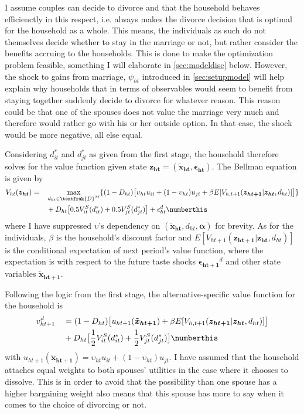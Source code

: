 I assume couples can decide to divorce and that the household behaves efficienctly in this respect, i.e. always makes the divorce decision that is optimal for the household as a whole. This means, the individuals as such do not themselves decide whether to stay in the marriage or not, but rather consider the benefits accruing to the households. This is done to make the optimization problem feasible, something I will elaborate in \autoref{sec:modeldisc} below. However, the shock to gains from marriage, $\psi_{ht}$ introduced in \autoref{sec:setupmodel} will help explain why households that in terms of observables would seem to benefit from staying together suddenly decide to divorce for whatever reason. This reason could be that one of the spouses does not value the marriage very much and therefore would rather go with his or her outside option. In that case, the shock would be more negative, all else equal.

Considering $d_{it}^*$ and $d_{jt}^*$ as given from the first stage, the household therefore solves for the value function given state $\boldsymbol{z_{ht}}=(\boldsymbol{\tilde{x}_{ht}},\boldsymbol{\epsilon_{ht}})$. The Bellman equation is given by
\begin{alignat*}{3}
&V_{ht}(\boldsymbol{z_{ht}})=&&\max_{d_{ht}\in \textfrak{D}^M} \{ (1-D_{ht})\big[\upsilon_{ht} u_{it}+(1-\upsilon_{ht})u_{jt} +\beta E[V_{h,t+1}(\boldsymbol{z_{ht+1}}|\boldsymbol{z_{ht}},d_{ht})] \big] \} \\
& &&+D_{ht}\big[0.5V_{it}^S(d_{it}^*)+0.5V_{jt}^S(d_{jt}^*)\big]+\epsilon_{ht}^d \numberthis
\label{eq:Vh}
\end{alignat*}
where I have suppressed $\upsilon$'s dependency on $(\boldsymbol{\tilde{x}_{ht}},d_{ht},\boldsymbol{\alpha})$ for brevity. As for the individuals, $\beta$ is the household's discount factor and $E[V_{ht+1}(\boldsymbol{z_{ht+1}}|\boldsymbol{z_{ht}},d_{ht})]$ is the conditional expectation of next period's value function, where the expectation is with respect to the future taste shocks $\boldsymbol{\epsilon_{ht+1}}^d$ and other state variables $\boldsymbol{\tilde{x}_{ht+1}}$.

Following the logic from the first stage, the alternative-specific value function for the household is
\begin{alignat*}{3}
&v_{ht+1}^d&&=(1-D_{ht})\big[u_{ht+1}(\boldsymbol{\tilde{x}_{ht+1}})+\beta E[V_{h,t+1}(\boldsymbol{z_{ht+1}}|\boldsymbol{z_{ht}},d_{ht})]\big] \\
& &&+D_{ht}\big[\frac{1}{2}V_{it}^S(d_{it}^*)+\frac{1}{2}V_{jt}^S(d_{jt}^*)\big] \numberthis
\label{eq:vh}
\end{alignat*}
with $u_{ht+1}(\boldsymbol{\tilde{x}_{ht+1}})=\upsilon_{ht} u_{it}+(1-\upsilon_{ht})u_{jt}$. I have assumed that the household attaches equal weights to both spouses' utilities in the case where it chooses to dissolve. This is in order to avoid that the possibility than one spouse has a higher bargaining weight also means that this spouse has more to say when it comes to the choice of divorcing or not.

